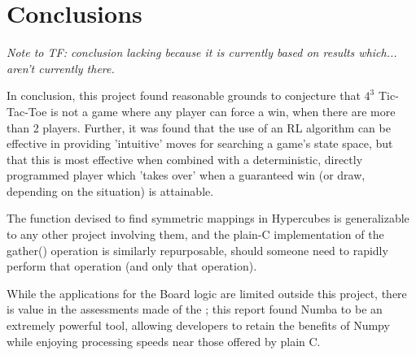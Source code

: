 \documentclass[12pt,a4paper]{article}
\begin{document}
\section{Conclusions}

\textit{Note to TF: conclusion lacking because it is currently based on results which... aren't currently there.}

In conclusion, this project found reasonable grounds to conjecture that $4^3$ Tic-Tac-Toe is not a game where any player can force a win, when there are more than 2 players. Further, it was found that the use of an RL algorithm can be effective in providing 'intuitive' moves for searching a game's state space, but that this is most effective when combined with a deterministic, directly programmed player which 'takes over' when a guaranteed win (or draw, depending on the situation) is attainable.

The function devised to find symmetric mappings in Hypercubes is generalizable to any other project involving them, and the plain-C implementation of the gather() operation is similarly repurposable, should someone need to rapidly perform that operation (and only that operation). 

While the applications for the Board logic are limited outside this project, there is value in the assessments made of the ; this report found Numba to be an extremely powerful tool, allowing developers to retain the benefits of Numpy while enjoying processing speeds near those offered by plain C.




\end{document}
